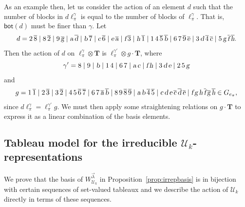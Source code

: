 \documentclass[ALCO,Unicode]{cedram}
\begin{document}
\begin{example}
As an example then, let us consider the action of an element $d$ such that
the number of blocks in $d \ell^\gamma_\pi$ is equal to the number of blocks
of $\ell^\gamma_\pi$.  That is, $\mathsf{bot}(d)$ must be finer than
$\gamma$.  Let 
\begin{equation*}
   d=  2\,\overline{8} \mid
            8\,\overline{2} \mid 9\,\overline{{\textsl g}} \mid {\textsl a}\,\overline{{\textsl d}} \mid {\textsl b}\,\overline{7} \mid {\textsl c}\,\overline{6} \mid {\textsl e}\,\overline{{\textsl a}} \mid
            {\textsl f}\,\overline{3} \mid {\textsl h}\,\overline{1} \mid
            1\,4\,\overline{5}\, \overline{{\textsl b}} \mid 6\,7\,\overline{9}\,\overline{{\textsl e}} \mid 3\,{\textsl d}\,\overline{4}\, \overline{{\textsl c}} \mid 5\,{\textsl g}\,\overline{{\textsl f}}\,\overline{{\textsl h}}.
\end{equation*}
Then the action of $d$ on $\ell_\pi^\gamma \otimes \mathbf{T}$ is
$\ell^{\gamma'}_\pi \otimes g \cdot {\mathbf T}$, where
\begin{equation*}
    \gamma' =
                8 \mid
                9 \mid
                {\textsl b} \mid
                1\,4 \mid
                6\,7 \mid
                {\textsl a}\,{\textsl c} \mid
                {\textsl f}\,{\textsl h} \mid
                3\,{\textsl d}\,{\textsl e} \mid
                2\,5\,{\textsl g}
 \end{equation*}
and 
\begin{equation*}
     g=1\, \overline{1} \mid
        2\, \overline{3} \mid
        3\, \overline{2} \mid
        4\,5\,\overline{6}\,\overline{7} \mid
        6\,7\,\overline{{\textsl a}}\,\overline{{\textsl b}} \mid
        8\,9\,\overline{8}\,\overline{9} \mid
        {\textsl a}\,{\textsl b}\,\overline{4}\,\overline{5} \mid
        {\textsl c}\,{\textsl d}\,{\textsl e}\,\overline{{\textsl c}}\,\overline{{\textsl d}}\,\overline{{\textsl e}} \mid
        {\textsl f}\,{\textsl g}\,{\textsl h}\,\overline{{\textsl f}}\,\overline{{\textsl g}}\,\overline{{\textsl h}}\in G_{e_\pi}, 
\end{equation*}
since $d \ell_\pi^\gamma = \ell_\pi^{\gamma'} g$. We must then
apply some straightening relations on $g \cdot \mathbf{T}$ to express it as
a linear combination of the basis elements.
\end{example}


\subsection{Tableau model for the irreducible $\mathcal{U}_k$-representations}
\label{sec:irreps-of-UBP-algebra-2}
We prove that the basis of $W_{\mathcal{U}_k}^{\vec{\lambda}}$ in
Proposition~\ref{prop:irrepbasis} is in bijection with certain sequences of
set-valued tableaux and we describe the action of $\mathcal{U}_k$ directly in
terms of these sequences.
\end{document}
